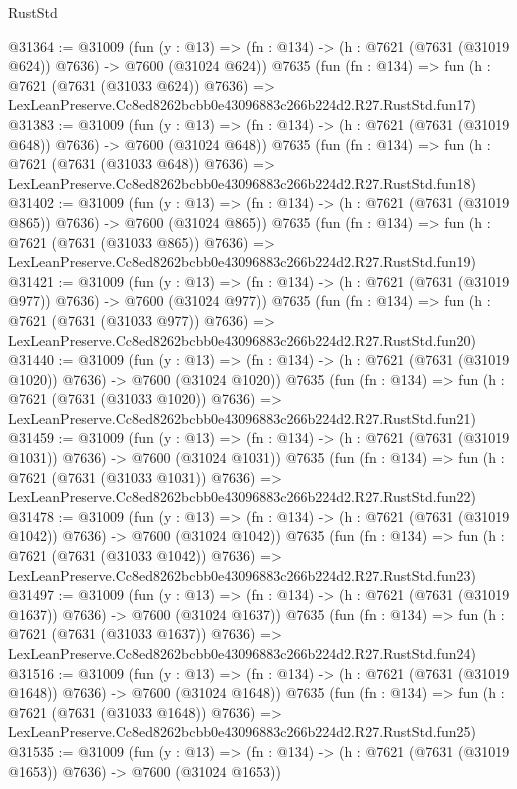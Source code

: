 \begin{lexlean}{RustStd}
\begin{coremodule}
@31364 := @31009
    (fun (y : @13) => (fn : @134) -> (h : @7621 (@7631 (@31019 @624)) @7636) -> @7600 (@31024 @624))
    @7635
    (fun (fn : @134) =>
    fun (h : @7621 (@7631 (@31033 @624)) @7636) =>
    LexLeanPreserve.Cc8ed8262bcbb0e43096883c266b224d2.R27.RustStd.fun17)
@31383 := @31009
    (fun (y : @13) => (fn : @134) -> (h : @7621 (@7631 (@31019 @648)) @7636) -> @7600 (@31024 @648))
    @7635
    (fun (fn : @134) =>
    fun (h : @7621 (@7631 (@31033 @648)) @7636) =>
    LexLeanPreserve.Cc8ed8262bcbb0e43096883c266b224d2.R27.RustStd.fun18)
@31402 := @31009
    (fun (y : @13) => (fn : @134) -> (h : @7621 (@7631 (@31019 @865)) @7636) -> @7600 (@31024 @865))
    @7635
    (fun (fn : @134) =>
    fun (h : @7621 (@7631 (@31033 @865)) @7636) =>
    LexLeanPreserve.Cc8ed8262bcbb0e43096883c266b224d2.R27.RustStd.fun19)
@31421 := @31009
    (fun (y : @13) => (fn : @134) -> (h : @7621 (@7631 (@31019 @977)) @7636) -> @7600 (@31024 @977))
    @7635
    (fun (fn : @134) =>
    fun (h : @7621 (@7631 (@31033 @977)) @7636) =>
    LexLeanPreserve.Cc8ed8262bcbb0e43096883c266b224d2.R27.RustStd.fun20)
@31440 := @31009
    (fun (y : @13) =>
    (fn : @134) -> (h : @7621 (@7631 (@31019 @1020)) @7636) -> @7600 (@31024 @1020))
    @7635
    (fun (fn : @134) =>
    fun (h : @7621 (@7631 (@31033 @1020)) @7636) =>
    LexLeanPreserve.Cc8ed8262bcbb0e43096883c266b224d2.R27.RustStd.fun21)
@31459 := @31009
    (fun (y : @13) =>
    (fn : @134) -> (h : @7621 (@7631 (@31019 @1031)) @7636) -> @7600 (@31024 @1031))
    @7635
    (fun (fn : @134) =>
    fun (h : @7621 (@7631 (@31033 @1031)) @7636) =>
    LexLeanPreserve.Cc8ed8262bcbb0e43096883c266b224d2.R27.RustStd.fun22)
@31478 := @31009
    (fun (y : @13) =>
    (fn : @134) -> (h : @7621 (@7631 (@31019 @1042)) @7636) -> @7600 (@31024 @1042))
    @7635
    (fun (fn : @134) =>
    fun (h : @7621 (@7631 (@31033 @1042)) @7636) =>
    LexLeanPreserve.Cc8ed8262bcbb0e43096883c266b224d2.R27.RustStd.fun23)
@31497 := @31009
    (fun (y : @13) =>
    (fn : @134) -> (h : @7621 (@7631 (@31019 @1637)) @7636) -> @7600 (@31024 @1637))
    @7635
    (fun (fn : @134) =>
    fun (h : @7621 (@7631 (@31033 @1637)) @7636) =>
    LexLeanPreserve.Cc8ed8262bcbb0e43096883c266b224d2.R27.RustStd.fun24)
@31516 := @31009
    (fun (y : @13) =>
    (fn : @134) -> (h : @7621 (@7631 (@31019 @1648)) @7636) -> @7600 (@31024 @1648))
    @7635
    (fun (fn : @134) =>
    fun (h : @7621 (@7631 (@31033 @1648)) @7636) =>
    LexLeanPreserve.Cc8ed8262bcbb0e43096883c266b224d2.R27.RustStd.fun25)
@31535 := @31009
    (fun (y : @13) =>
    (fn : @134) -> (h : @7621 (@7631 (@31019 @1653)) @7636) -> @7600 (@31024 @1653))

\end{coremodule}
\end{lexlean}
